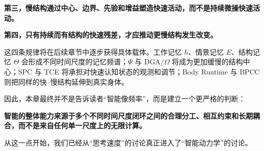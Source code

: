 \begin{statementbox}
\bfseries 第三，慢结构通过中心、边界、先验和增益塑造快速活动，而不是持续微操快速活动。
\end{statementbox}

\begin{statementbox}
\bfseries 第四，只有持续而有结构的快速残差，才应推动更慢结构发生改变。
\end{statementbox}

这四条规律将在后续章节中逐步获得具体载体。工作记忆 $h$、情景记忆 $E$、结构记忆 $\Theta$ 会形成不同时间尺度的记忆频谱；$\Psi$ 与 DGA/$\Omega$ 将成为更加缓慢的结构中心；SPC 与 TCE 将承担对快速认知状态的观测和调节；Body Runtime 与 BPCC 则把同样的快--慢结构延伸到真实身体。

因此，本章最终并不是告诉读者“智能像频率”，而是建立一个更严格的判断：

\begin{proposition*}
\bfseries
智能的整体能力来源于多个不同时间尺度闭环之间的合理分工、相互约束和长期耦合，而不是来自任何单一尺度上的无限计算。
\end{proposition*}

从这一点开始，我们已经从“思考速度”的讨论真正进入了“智能动力学”的讨论。
